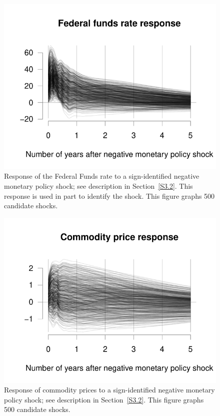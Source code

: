 \documentclass[12pt,fleqn]{article}
\begin{document}
\begin{figure}[t]
  \centering
  \includegraphics{graphs/empirics_FYFF}
  \caption{%
    Response of the Federal Funds rate to a sign-identified negative
    monetary policy shock; see description in Section~\ref{S3.2}. This
    response is used in part to identify the shock. This figure graphs
    500 candidate shocks.}
  \label{fig:7}
\end{figure}

\begin{figure}[t]
  \centering
  \includegraphics{graphs/empirics_PSCCOM}
  \caption{%
    Response of commodity prices to a sign-identified negative
    monetary policy shock; see description in Section~\ref{S3.2}. This
    figure graphs 500 candidate shocks.}
  \label{fig:8}
\end{figure}
\end{document}
